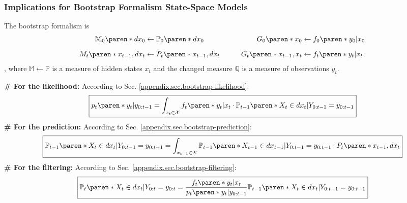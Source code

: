 \subsubsection{Implications for Bootstrap Formalism State-Space Models}
%
The bootstrap formalism is
%
\begin{alignat*}{3}
    \mathbb{M}_{0} \paren*{dx_{0}} &\leftarrow
        \mathbb{P}_{0} \paren*{dx_{0}}
    & \qquad
    G_{0} \paren*{x_{0}} &\leftarrow
        f_{0} \paren*{ y_{0} \vert x_{0} }
    \\[1.5ex]
    M_{t} \paren*{x_{t-1}, dx_{t}} &\leftarrow
        P_{t} \paren*{x_{t-1}, dx_{t}}
    & \qquad
    G_{t} \paren*{x_{t-1}, x_{t}} &\leftarrow
        f_{t} \paren*{ y_{t} \vert x_{t} }
    \,.
\end{alignat*}
%
, where $\mathbb{M} \leftarrow \mathbb{P}$ is a measure of hidden states $x_{t}$ and the changed measure $\mathbb{Q}$ is a measure of observations $y_{t}$.

\textbf{\# For the likelihood:}
%
According to Sec. \ref{appendix.sec.bootstrap-likelihood}:
%
\begin{equation*}
    \boxed{
        p_{t} \paren*{ y_{t} \vert y_{0:t-1} } =
            \int_{x_{t} \in \mathcal{X}}
            f_{t} \paren*{ y_{t} \vert x_{t} } \cdot
            \mathbb{P}_{t-1} \paren*{ X_{t} \in dx_{t} \vert Y_{0:t-1} = y_{0:t-1}}
    }
\end{equation*}
%
\textbf{\# For the prediction:}
%
According to Sec. \ref{appendix.sec.bootstrap-prediction}:
%
\begin{equation*}
    \boxed{
        \mathbb{P}_{t-1}
            \paren*{ X_{t} \in dx_{t} \vert Y_{0:t-1} = y_{0:t-1}}
        =
            \int_{x_{t-1} \in \mathcal{X}} \mathbb{P}_{t-1}
            \paren*{ X_{t-1} \in dx_{t-1} \vert Y_{0:t-1} = y_{0:t-1}}
            \cdot P_{t} \paren*{x_{t-1}, dx_{t}}
    }
\end{equation*}
%
\textbf{\# For the filtering:}
%
According to Sec. \ref{appendix.sec.bootstrap-filtering}:
%
\begin{equation*}
    \boxed{
        \mathbb{P}_{t} \paren*{ X_{t} \in dx_{t} \vert Y_{0:t} = y_{0:t}}
        =
            \dfrac{
                f_{t} \paren*{ y_{t} \vert x_{t} }
            }{
                p_{t} \paren*{ y_{t} \vert y_{0:t-1} }
            }
            \mathbb{P}_{t-1} \paren*{ X_{t} \in dx_{t} \vert Y_{0:t-1} = y_{0:t-1}}
    }
\end{equation*}

